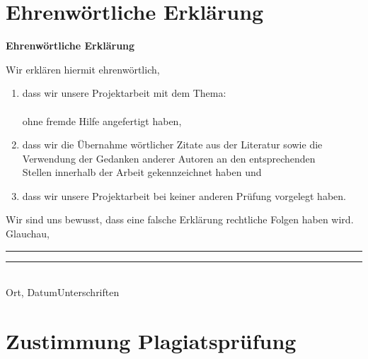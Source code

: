\cleardoublepage
\chapter{Ehrenwörtliche Erklärung}
    \vspace*{1cm}
    \begin{center}
        \huge\textbf{Ehrenwörtliche Erklärung}\\
    \end{center}
    \vspace*{1cm}
    \normalsize
    Wir erklären hiermit ehrenwörtlich,

    \begin{enumerate}
        \vspace{1cm}
        \item dass wir unsere Projektarbeit mit dem Thema:\\

        \textbf{\titel }\\

        ohne fremde Hilfe angefertigt haben,
        \item dass wir die Übernahme wörtlicher Zitate aus der Literatur sowie die\\
        Verwendung der Gedanken anderer Autoren an den entsprechenden\\
        Stellen innerhalb der Arbeit gekennzeichnet haben und
        \item dass wir unsere Projektarbeit bei keiner anderen Prüfung vorgelegt haben.\\[1,5cm]
    \end{enumerate}
    Wir sind uns bewusst, dass eine falsche Erklärung rechtliche Folgen haben wird.\\[1,5cm]

    Glauchau, \abgabedatum\newline\noindent\rule{0.35\columnwidth}{0.4pt}\hspace{0.05\columnwidth}\rule{0.6\columnwidth}{0.4pt}\\
    Ort, Datum\hspace{0.27\columnwidth}Unterschriften


    \newpage
\chapter{Zustimmung Plagiatsprüfung}

    \vspace*{2mm}

